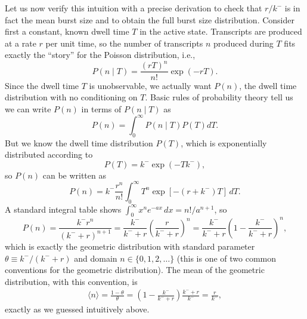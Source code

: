 Let us now verify this intuition with a precise derivation to check that $r/k^-$
is in fact the mean burst size and to obtain the full burst size distribution.
Consider first a constant, known dwell time $T$ in the active state. Transcripts
are produced at a rate $r$ per unit time, so the number of transcripts $n$
produced during $T$ fits exactly the ``story'' for the Poisson distribution,
i.e.,
\begin{equation}
    P(n\mid T) = \frac{(rT)^n}{n!} \exp(-rT).
\end{equation}
Since the dwell time $T$ is unobservable, we actually want $P(n)$, the dwell
time distribution with no conditioning on $T$. Basic rules of probability theory
tell us we can write $P(n)$ in terms of $P(n\mid T)$ as
\begin{equation}
    P(n) =\int_0^\infty P(n\mid T) P(T) dT.
\end{equation}
But we know the dwell time distribution $P(T)$, which is exponentially
distributed according to
\begin{equation}
    P(T) = k^- \exp(-T k^-),
\end{equation}
so $P(n)$ can be written as
\begin{equation}
    P(n) = k^- \frac{r^n}{n!}
            \int_0^\infty T^n\exp[-(r + k^-)T]\,dT.
\end{equation}
A standard integral table shows $\int_0^\infty x^n e^{-ax}\,dx = n!/a^{n+1}$, so
\begin{equation}
    P(n) = \frac{k^- r^n}{(k^- + r)^{n+1}}
        = \frac{k^-}{k^- + r}
            \left(\frac{r}{k^- + r}\right)^n
        = \frac{k^-}{k^- + r}
            \left(1 - \frac{k^-}{k^- + r}\right)^n,
\end{equation}
which is exactly the geometric distribution with standard parameter
$\theta\equiv k^-/(k^- + r)$ and domain $n \in \{0, 1, 2, \dots\}$ (this is one
of two common conventions for the geometric distribution). The mean of the
geometric distribution, with this convention, is
\begin{align}
\langle n\rangle = \frac{1 - \theta}{\theta}
        = \left(1 - \frac{k^-}{k^- + r}\right)
                    \frac{k^- + r}{k^-}
        = \frac{r}{k^-},
\end{align}
exactly as we guessed intuitively above.

